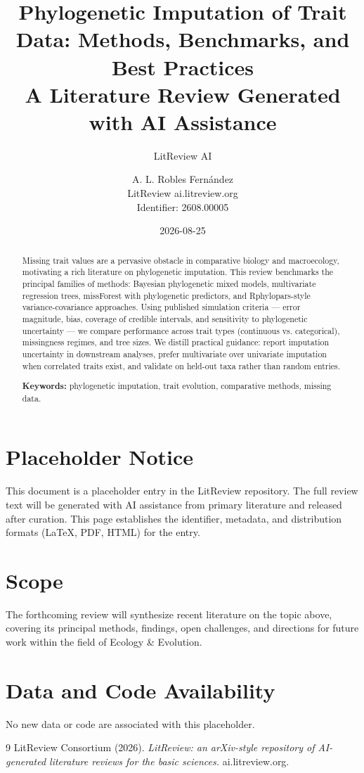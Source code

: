 \documentclass[11pt]{article}
\title{Phylogenetic Imputation of Trait Data: Methods, Benchmarks, and Best Practices\\
\large A Literature Review Generated with AI Assistance}
\author{LitReview AI \and A. L. Robles Fernández\\[4pt]
\small LitReview \textbar{} ai.litreview.org\\
\small Identifier: 2608.00005}
\date{2026-08-25}
\begin{document}
\maketitle

\begin{abstract}
Missing trait values are a pervasive obstacle in comparative biology and macroecology, motivating a rich literature on phylogenetic imputation. This review benchmarks the principal families of methods: Bayesian phylogenetic mixed models, multivariate regression trees, missForest with phylogenetic predictors, and Rphylopars-style variance-covariance approaches. Using published simulation criteria — error magnitude, bias, coverage of credible intervals, and sensitivity to phylogenetic uncertainty — we compare performance across trait types (continuous vs. categorical), missingness regimes, and tree sizes. We distill practical guidance: report imputation uncertainty in downstream analyses, prefer multivariate over univariate imputation when correlated traits exist, and validate on held-out taxa rather than random entries.

\noindent\textbf{Keywords:} phylogenetic imputation, trait evolution, comparative methods, missing data.
\end{abstract}

\section*{Placeholder Notice}
This document is a placeholder entry in the LitReview repository. The full
review text will be generated with AI assistance from primary literature and
released after curation. This page establishes the identifier, metadata, and
distribution formats (LaTeX, PDF, HTML) for the entry.

\section*{Scope}
The forthcoming review will synthesize recent literature on the topic above,
covering its principal methods, findings, open challenges, and directions for
future work within the field of Ecology \& Evolution.

\section*{Data and Code Availability}
No new data or code are associated with this placeholder.


\begin{thebibliography}{9}
 LitReview Consortium (2026). \emph{LitReview: an arXiv-style repository of AI-generated literature reviews for the basic sciences.} ai.litreview.org.
\end{thebibliography}
\end{document}
